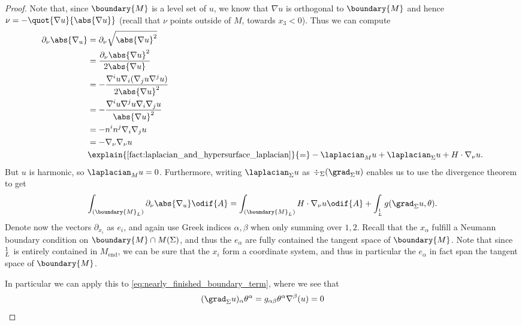 \documentclass[titlepage,numbers=noenddot,headinclude,oneside,%
footinclude=true,cleardoublepage=empty,%
BCOR=5mm,paper=a4,fontsize=11pt,%
english,%
]{scrartcl}
\let\sphere\relax
\newcommand{\sphere}{\mathbb{S}}
\newcommand{\Mend}{M_{\mathrm{end}}} %
\begin{document}
\begin{proof}
    Note that, since \( \boundary{M} \) is a level set of \( u \), we know that \( \nabla u \) is orthogonal to \( \boundary{M} \) and hence \( \nu=-\quot{\nabla u}{\abs{\nabla u}} \) (recall that \( \nu \) points outside of \( M \), \ie towards \( x_3<0 \)). Thus we can compute
    \begin{equation*}
        \begin{aligned}[t]
            \partial_{\nu}\abs{\nabla_u}&=\partial_{\nu} \sqrt{\abs{\nabla u}^2}\\
            &=\frac{\partial_{\nu} \abs{\nabla u}^2}{2\abs{\nabla u}}\\
            &=-\frac{\nabla^i u \nabla_i(\nabla_j u \nabla^j u)}{2\abs{\nabla u}^2}\\
            &=-\frac{\nabla^i u \nabla^j u \nabla_i \nabla_j u}{\abs{\nabla u}^2}\\
            &=-n^i n^j \nabla_i \nabla_j u\\
            &=-\nabla_{\nu}\nabla_{\nu} u\\
            &\explain{\Cref{fact:laplacian_and_hypersurface_laplacian}}{=}-\laplacian_M u+\laplacian_{\Sigma} u +H\cdot \nabla_{\nu} u.
        \end{aligned}
    \end{equation*}
    But \( u \) is harmonic, so \( \laplacian_M u=0 \). Furthermore, writing \( \laplacian_\Sigma u \) as \( \div_{\Sigma}(\grad_{\Sigma}u) \) enables us to use the divergence theorem to get
    \begin{equation}
        \int_{(\boundary{M}_L)}\partial_{\nu}\abs{\nabla_u}\odif{A}=\int_{(\boundary{M}_L)} H\cdot \nabla_{\nu} u\odif{A}+\int_{\sphere^1_L}g(\grad_{\Sigma}u,\theta).\label{eq:nearly_finished_boundary_term}
    \end{equation} 
    Denote now the vectors \( \partial_{x_i} \) as \( e_i \), and again use Greek indices \( \alpha,\beta \) when only summing over \( 1,2 \). Recall that the \( x_{\alpha} \) fulfill a Neumann boundary condition on \( \boundary{M}\cap M(\Sigma) \), and thus the \( e_{\alpha} \) are fully contained the tangent space of \( \boundary{M} \). Note that since \( \sphere^1_L \) is entirely contained in \( \Mend \), we can be sure that the \( x_i \) form a coordinate system, and thus in particular the \( e_{\alpha} \) in fact span the tangent space of \( \boundary{M} \).

    In particular we can apply this to \eqref{eq:nearly_finished_boundary_term}, where we see that
    \begin{equation*}
        (\grad_{\Sigma}u)_\alpha\theta^\alpha =g_{\alpha \beta}\theta^\alpha \nabla^\beta(u)=0
    \end{equation*}
\end{proof}
\end{document}
